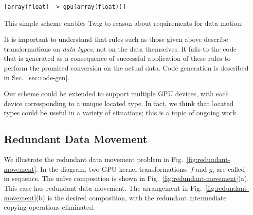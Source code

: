 \begin{verbatim}
[array(float) -> gpu(array(float))]
\end{verbatim}

This simple scheme enables Twig to reason about requirements for data motion.

It is important to understand that rules such as those given above describe transformations on \emph{data types}, not on the data themselves. It falls to the code that is generated as a consequence of successful application of these rules to perform the promised conversion on the actual data. Code generation is described in Sec.~\ref{sec:code-gen}.

Our scheme could be extended to support multiple GPU devices, with each device corresponding to a unique located type. In fact, we think that located types could be useful in a variety of situations; this is a topic of ongoing work.

\subsection{Redundant Data Movement}

We illustrate the redundant data movement problem in Fig.~\ref{fig:redundant-movement}. In the diagram, two GPU kernel transformations, $f$ and $g$, are called in sequence. The na\"ive composition is shown in Fig.~\ref{fig:redundant-movement}(a). This case has redundant data movement. The arrangement in Fig.~\ref{fig:redundant-movement}(b) is the desired composition, with the redundant intermediate copying operations eliminated.

